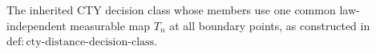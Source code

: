 The inherited CTY decision class whose members use one common law-independent measurable map \(T_n\) at all boundary points, as constructed in \(\mathrm{def:cty\text{-}distance\text{-}decision\text{-}class}\).